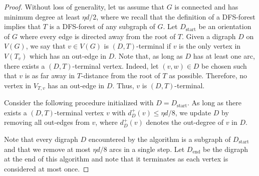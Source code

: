 \documentclass[10pt]{article}
\theoremstyle{definition}
\let\leq\leqslant
\begin{document}
\begin{proof}
    Without loss of generality, let us assume that $G$ is connected and has minimum degree at least $\eta d/2$, where we recall that the definition of a DFS-forest implies that $T$ is a DFS-forest of any subgraph of $G$. Let $D_{\mathrm{start}}$ be an orientation of $G$ where every edge is directed away from the root of $T$. Given a digraph $D$ on $V(G)$, we say that $v\in V(G)$ is $(D,T)$-terminal if $v$ is the only vertex in $V(T_v)$ which has an out-edge in $D$. Note that, as long as $D$ has at least one arc, there exists a $(D,T)$-terminal vertex. Indeed, let $(v,w)\in D$ be chosen such that $v$ is as far away in $T$-distance from the root of $T$ as possible. Therefore, no vertex in $V_{T,v}$ has an out-edge in $D$. Thus, $v$ is $(D,T)$-terminal. 

    Consider the following procedure initialized with $D=D_{\mathrm{start}}$. As long as there exists a $(D,T)$-terminal vertex $v$ with $d^+_D(v)\leq \eta d/8$, we update $D$ by removing all out-edges from $v$, where $d^+_D(v)$ denotes the out-degree of $v$ in $D$.
    
    Note that every digraph $D$ encountered by the algorithm is a subgraph of $D_{\mathrm{start}}$ and that we remove at most $ \eta d/8$ arcs in a single step. Let $D_{\mathrm{end}}$ be the digraph at the end of this algorithm and note that it terminates as each vertex is considered at most once.


\end{proof}
\end{document}
